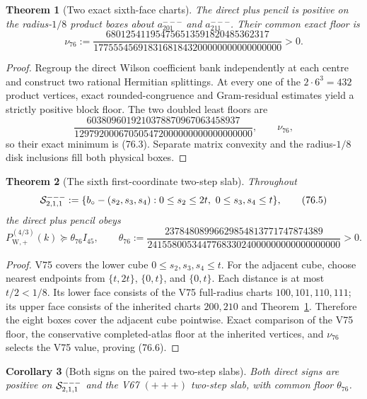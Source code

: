 \documentclass[11pt,oneside]{article}
\newtheorem{theorem}{Theorem}[section]
\newtheorem{corollary}[theorem]{Corollary}
\theoremstyle{definition}
\theoremstyle{remark}
\begin{document}
\begin{theorem}[Two exact sixth-face charts]
\label{thm:newv76-two-charts}
The direct plus pencil is positive on the radius-\(1/8\) product
boxes about \(a^{---}_{201}\) and \(a^{---}_{211}\).  Their common
exact floor is
\[
 \nu_{76}:=
 \frac{680125411954756513591820485362317}
 {17755545691831681843200000000000000000}>0.           \tag{76.3}
\]
\end{theorem}

\begin{proof}
Regroup the direct Wilson coefficient bank independently at each
centre and construct two rational Hermitian splittings.  At every
one of the \(2\cdot6^3=432\) product vertices, exact
rounded-congruence and Gram-residual estimates yield a strictly
positive block floor.  The two doubled least floors are
\[
 \frac{6038096019210378870967063458937}
 {129792000670505472000000000000000000},
 \qquad
 \nu_{76},                                             \tag{76.4}
\]
so their exact minimum is (76.3).  Separate matrix convexity and the
radius-\(1/8\) disk inclusions fill both physical boxes.
\end{proof}

\begin{theorem}[The sixth first-coordinate two-step slab]
\label{thm:newv76-two-step-slab}
Throughout
\[
 {\cal S}^{---}_{2,1,1}:=
 \{b_\circ-(s_2,s_3,s_4):
      0\le s_2\le2t,\ 0\le s_3,s_4\le t\},             \tag{76.5}
\]
the direct plus pencil obeys
\[
 P_{\mathrm W,+}^{(4/3)}(k)
 \succeq\theta_{76}I_{45},\qquad
 \theta_{76}:=
 \frac{23784808996629854813771747874389}
 {241558005344776833024000000000000000000}>0.          \tag{76.6}
\]
\end{theorem}

\begin{proof}
V75 covers the lower cube \(0\le s_2,s_3,s_4\le t\).
For the adjacent cube, choose nearest endpoints from
\(\{t,2t\}\), \(\{0,t\}\), and \(\{0,t\}\).  Each distance is at
most \(t/2<1/8\).  Its lower face consists of the V75 full-radius
charts \(100,101,110,111\); its upper face consists of the inherited
charts \(200,210\) and Theorem~\ref{thm:newv76-two-charts}.
Therefore the eight boxes cover the adjacent cube pointwise.
Exact comparison of the V75 floor, the conservative completed-atlas
floor at the inherited vertices, and \(\nu_{76}\) selects the V75
value, proving (76.6).
\end{proof}

\begin{corollary}[Both signs on the paired two-step slabs]
\label{cor:newv76-paired-slabs}
Both direct signs are positive on \({\cal S}^{---}_{2,1,1}\) and
the V67 \((+++)\) two-step slab, with common floor
\(\theta_{76}\).
\end{corollary}
\end{document}
